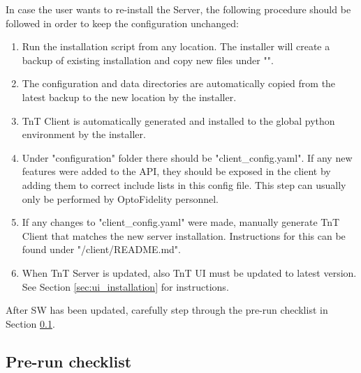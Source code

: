 In case the user wants to re-install the Server, the following procedure should be followed in order to keep the configuration unchanged:
%
\begin{enumerate}
	\item Run the installation script from any location. The installer will create a backup of existing installation and copy new files under "\tntRootPathMacos\tntServerFolder". 
	\item The configuration and data directories are automatically copied from the latest backup to the new location by the installer.
	\item TnT Client is automatically generated and installed to the global python environment by the installer.
	\item Under "configuration" folder there should be "client\_config.yaml". If any new features were added to the API, they should be exposed in the client by adding them to correct include lists in this config file. This step can usually only be performed by OptoFidelity personnel.
	\item If any changes to "client\_config.yaml" were made, manually generate TnT Client that matches the new server installation. Instructions for this can be found under "\tntServerFolder/client/README.md".
	\item When TnT Server is updated, also TnT UI must be updated to latest version. See Section \ref{sec:ui_installation} for instructions.
\end{enumerate}

After SW has been updated, carefully step through the pre-run checklist in Section \ref{sec:pre_run_checklist}.

\subsection{Pre-run checklist}
\label{sec:pre_run_checklist}

